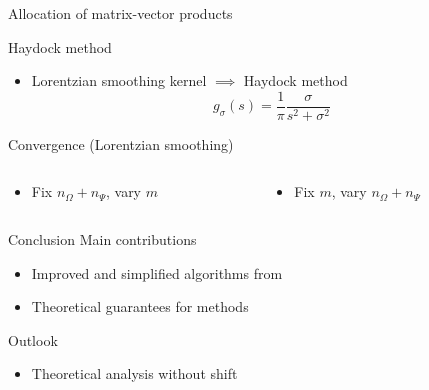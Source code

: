\documentclass[aspectratio=169, leqno, 12pt]{beamer}
\begin{document}
\begin{frame}{Allocation of matrix-vector products}
    
\end{frame}

\begin{frame}{Haydock method}
    \begin{itemize}
        \item Lorentzian smoothing kernel $\implies$ Haydock method \cite{lin2016review}
    \begin{equation}
        g_{\sigma}(s) = \frac{1}{\pi} \frac{\sigma}{s^2 + \sigma^2}
    \end{equation}
    \end{itemize}
    \centering
    
\end{frame}
 
\begin{frame}{Convergence (Lorentzian smoothing)}
    \begin{columns}
        \begin{column}{0.5\textwidth}
            \begin{itemize}
                \item Fix $n_{\Omega} + n_{\Psi}$, vary $m$
            \end{itemize}
            \scalebox{1.0}{}
        \end{column}
        \begin{column}{0.5\textwidth}
            \begin{itemize}
                \item Fix $m$, vary $n_{\Omega} + n_{\Psi}$
            \end{itemize}
            \scalebox{1.0}{}
        \end{column}
    \end{columns}
\end{frame}

\begin{frame}{Conclusion}
    Main contributions
    \begin{itemize}
        \item Improved and simplified algorithms from \cite{lin2017randomized}
        \item Theoretical guarantees for methods
    \end{itemize}
    Outlook
    \begin{itemize}
        \item Theoretical analysis without shift
    \end{itemize}
\end{frame}
\end{document}
